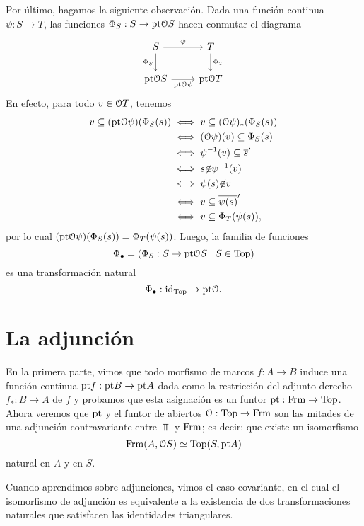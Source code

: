 Por último, hagamos la siguiente observación.
Dada una función continua $\psi:S\to T$,
las funciones $\Phi_S:S\to\pt\cal OS$ hacen conmutar el diagrama
\[
    \begin{tikzcd}
        S \ar[r,"\psi"] \ar[d,"\Phi_S"'] & T \ar[d,"\Phi_T"] \\
        \pt\cal OS \ar[r,"\pt\cal O\psi"'] & \pt\cal OT
    \end{tikzcd}
\]
En efecto, para todo $v\in\cal OT$, tenemos
\begin{align*}
    v\subseteq (\pt\cal O\psi)(\Phi_S(s))
    &\iff v\subseteq (\cal O\psi)_*(\Phi_S(s)) \\
    &\iff (\cal O\psi)(v) \subseteq \Phi_S(s) \\
    &\iff \psi^{-1}(v) \subseteq \ol{s}' \\
    &\iff s\nin \psi^{-1}(v) \\
    &\iff \psi(s)\nin v \\
    &\iff v\subseteq \ol{\psi(s)}' \\
    &\iff v\subseteq \Phi_T(\psi(s)),
\end{align*}
por lo cual $(\pt\cal O\psi)(\Phi_S(s))=\Phi_T(\psi(s))$.
Luego, la familia de funciones
\[
    \Phi_\bullet=(\Phi_S:S\to\pt\cal OS\mid S\in \Top)
\]
es una transformación natural
\[
    \Phi_\bullet : \id_\Top\to\pt\cal O
.\]

\section{La adjunción}
    \label{ssec:adjuncion}
En la primera parte, vimos que todo morfismo de marcos
$f:A\to B$ induce una función continua $\pt f:\pt B\to\pt A$ dada
como la restricción del adjunto derecho $f_*:B\to A$ de $f$ y
probamos que esta asignación es un funtor $\pt:\Frm\to\Top$.
Ahora veremos que $\pt$ y el funtor de abiertos
$\cal O:\Top\to\Frm$ son las mitades de una adjunción contravariante
entre $\Top$ y $\Frm$; es decir: que existe un isomorfismo
\begin{equation}
    \label{eqn:adj_frm_top}
    \Frm(A,\cal OS) \simeq \Top(S,\pt A)
\end{equation}
natural en $A$ y en $S$.

Cuando aprendimos sobre adjunciones,
vimos el caso covariante, en el cual el isomorfismo de
adjunción es equivalente a la existencia de dos transformaciones
naturales que satisfacen las identidades triangulares.

